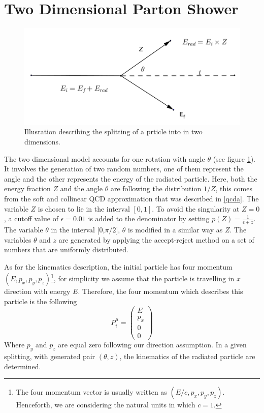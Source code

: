 \section{Two Dimensional Parton Shower}

\begin{figure}[hbtp]
\centering
\includegraphics[scale=.35]{images/tt.png}
\caption{Illusration describing the splitting of a prticle into in two dimensions.}\label{fig:tt}
\end{figure}

The two dimensional model accounts for one rotation with angle $\theta$ (see figure \ref{fig:tt}). It involves the 
generation of two random numbers, one of them represent the angle and the other represents the energy of the radiated particle. Here, both the energy fraction $Z$ and the angle $\theta$ are following the distribution $1/Z$, this comes from the soft and collinear QCD approximation that was described in \ref{qcda}.
The variable $Z$ is chosen to lie in the interval $[0, 1]$.
To avoid the singularity at $Z = 0$, a cutoff value of $\epsilon = 0.01$ is added to the denominator by setting  $p(Z) = \frac{1}{\epsilon + z}$. The variable $\theta$ in the interval [0,$\pi/2$], $\theta$ is modified in a similar way as $Z$. The variables $\theta$ and $z$ are generated by applying the accept-reject method on a set of numbers that are uniformly distributed.

As for the kinematics description, the initial particle has four momentum $(E, p_{x}, p_{y},p_{z})$\footnote{The four momentum vector is usually written as $(E/c, p_{x}, p_{y},p_{z})$. Henceforth, we are considering the natural units in which $c = 1$.}, for simplicity we assume that the particle is travelling in $x$ direction with energy $E$. Therefore, the four momentum which describes this particle is the following 
\begin{equation}
P^{\mu}_{i}  = \begin{pmatrix}
E\\
p_x\\
0\\
0
\end{pmatrix}
\end{equation}
Where $p_y$ and $p_z$ are equal zero following our direction assumption. In a given splitting, with generated pair $(\theta, z)$, the kinematics of the radiated particle are determined.

